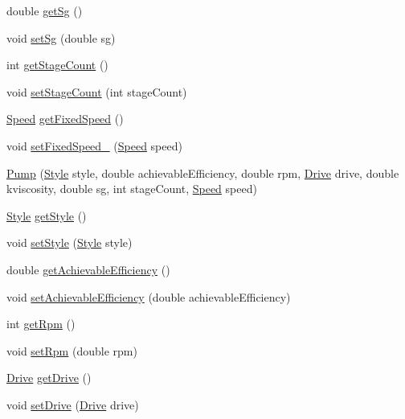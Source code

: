 \begin{DoxyCompactItemize}
double \hyperlink{class_pump_ae30109b8533176cc1c7c80cf9df95631}{get\+Sg} ()
\item 
void \hyperlink{class_pump_a9b9773b74e0e56acece38107ab547728}{set\+Sg} (double sg)
\item 
int \hyperlink{class_pump_a2a8754f53b289dc41f3220adc4eb56e1}{get\+Stage\+Count} ()
\item 
void \hyperlink{class_pump_a28943405616a792c970b7e9bbf01c1b2}{set\+Stage\+Count} (int stage\+Count)
\item 
\hyperlink{class_pump_ae443603074ebca82f0b89209482d10b6}{Speed} \hyperlink{class_pump_ae9a63b7e616ba2ef7723d1040af241b4}{get\+Fixed\+Speed} ()
\item 
void \hyperlink{class_pump_a9e74b484f468a14076fb12d8b991e24b}{set\+Fixed\+Speed\+\_\+} (\hyperlink{class_pump_ae443603074ebca82f0b89209482d10b6}{Speed} speed)
\item 
\hyperlink{class_pump_a40479645281006efd81d3074f64d84ea}{Pump} (\hyperlink{class_pump_aef354601ce4218258cc898b35a1e90ff}{Style} style, double achievable\+Efficiency, double rpm, \hyperlink{class_pump_a32bf0ade131a11bb3b3fb374f638e983}{Drive} drive, double kviscosity, double sg, int stage\+Count, \hyperlink{class_pump_ae443603074ebca82f0b89209482d10b6}{Speed} speed)
\item 
\hyperlink{class_pump_aef354601ce4218258cc898b35a1e90ff}{Style} \hyperlink{class_pump_ab75d877769b5232c5ab7b4d92940579a}{get\+Style} ()
\item 
void \hyperlink{class_pump_a4852cb47f40a46ba84c7dff91d1abd53}{set\+Style} (\hyperlink{class_pump_aef354601ce4218258cc898b35a1e90ff}{Style} style)
\item 
double \hyperlink{class_pump_acf100af543142ab8404fc0ce2df1d157}{get\+Achievable\+Efficiency} ()
\item 
void \hyperlink{class_pump_a183f83fcc4b77e330451000df4d91046}{set\+Achievable\+Efficiency} (double achievable\+Efficiency)
\item 
int \hyperlink{class_pump_a66870deae37979d64a910b89c6977b26}{get\+Rpm} ()
\item 
void \hyperlink{class_pump_a7478d85c3b89cda275b039673603a785}{set\+Rpm} (double rpm)
\item 
\hyperlink{class_pump_a32bf0ade131a11bb3b3fb374f638e983}{Drive} \hyperlink{class_pump_a7eae412e42d0a3351408391cd5fbef4e}{get\+Drive} ()
\item 
void \hyperlink{class_pump_a54b6fc1aa44cc8377914ccb94738723a}{set\+Drive} (\hyperlink{class_pump_a32bf0ade131a11bb3b3fb374f638e983}{Drive} drive)

\end{DoxyCompactItemize}
